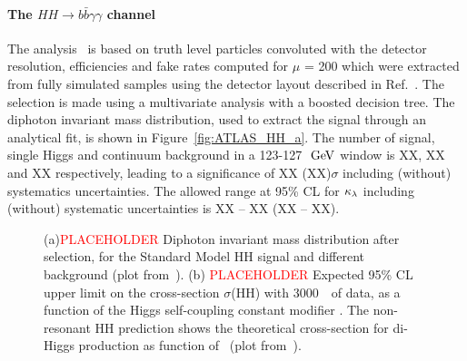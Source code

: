 %
\paragraph{The $HH \rightarrow b\bar{b}\gamma\gamma$ channel}


The analysis~\cite{ATLASHHPUBnote} is based on truth level particles convoluted with the detector resolution, efficiencies and fake rates computed for $\mu$ = 200 which were extracted from fully simulated samples using the detector layout described in Ref.~\cite{ITKPixelTDR}. The selection is made using a multivariate analysis with a boosted decision tree. The diphoton invariant mass distribution, used to extract the signal through an analytical fit, is shown in Figure~\ref{fig:ATLAS_HH_a}. The number of signal, single Higgs and continuum background in a 123-127~$\,\mathrm{GeV}$ window is XX, XX and XX respectively, leading to a significance of XX (XX)$\sigma$ including (without) systematics uncertainties. The allowed range at 95\% CL for $\kappa_{\lambda}$ including (without) systematic uncertainties is XX -- XX (XX -- XX).


\begin{figure}[!htb]
\centering 
{} 
\caption{(a)\textcolor{red}{PLACEHOLDER} Diphoton invariant mass distribution after selection, for the Standard Model HH signal and different background (plot from~\cite{ITKPixelTDR}). (b) \textcolor{red}{PLACEHOLDER} Expected 95\% CL upper limit on the cross-section $\sigma$(HH) with 3000~\ifb\ of data, as a function of the Higgs self-coupling constant modifier \kl. The non-resonant HH prediction shows the theoretical cross-section for di-Higgs production as function of \kl\ (plot from~\cite{ITKPixelTDR}).} 
\label{fig:ATLAS_HH} 
\end{figure}



